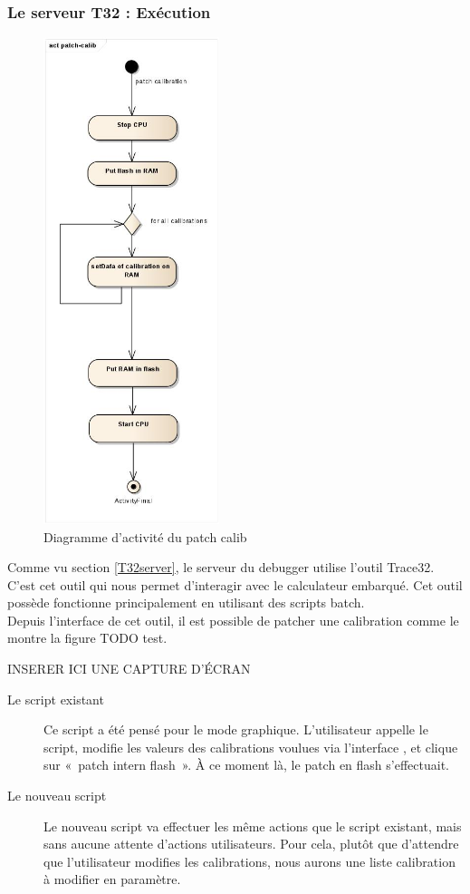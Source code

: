 	\subsubsection{Le serveur T32 : Exécution}
		\begin{figure}
			\vspace{-65px}
			\includegraphics[height=14.2cm]{contents/images/script_activite.jpg}
			\caption{Diagramme d'activité du patch calib}
			\label{fig:scriptBatch} 
						\vspace{-3cm}
		\end{figure}
	Comme vu section \ref{T32server}, le serveur du debugger utilise l'outil Trace32. C'est cet outil qui nous permet d’interagir avec le calculateur embarqué. Cet outil possède fonctionne principalement en utilisant des scripts batch.\\
	Depuis l'interface de cet outil, il est possible de patcher une calibration comme le montre la figure TODO test.
	
	 INSERER ICI UNE CAPTURE D'ÉCRAN

	\begin{description}
		\item[Le script existant] Ce script a été pensé pour le mode graphique. L'utilisateur appelle le script, modifie les valeurs des calibrations voulues via l'interface , et clique sur «~patch intern flash~». À ce moment là, le patch en flash s'effectuait.
		\item[Le nouveau script] Le nouveau script va effectuer les même actions que le script existant, mais sans aucune attente d'actions utilisateurs. Pour cela, plutôt que d'attendre que l'utilisateur modifies les calibrations, nous aurons une liste calibration à modifier en paramètre.
	\end{description}

